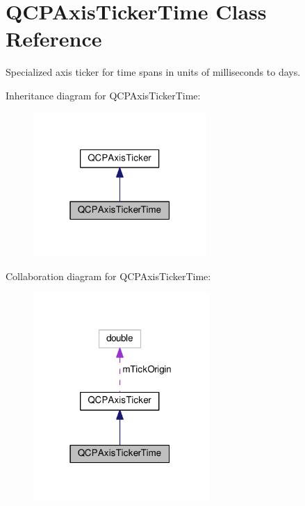 \hypertarget{classQCPAxisTickerTime}{}\section{Q\+C\+P\+Axis\+Ticker\+Time Class Reference}
\label{classQCPAxisTickerTime}


Specialized axis ticker for time spans in units of milliseconds to days.  




Inheritance diagram for Q\+C\+P\+Axis\+Ticker\+Time\+:
\nopagebreak
\begin{figure}[H]
\begin{center}
\leavevmode
\includegraphics[width=187pt]{classQCPAxisTickerTime__inherit__graph}
\end{center}
\end{figure}


Collaboration diagram for Q\+C\+P\+Axis\+Ticker\+Time\+:
\nopagebreak
\begin{figure}[H]
\begin{center}
\leavevmode
\includegraphics[width=190pt]{classQCPAxisTickerTime__coll__graph}
\end{center}
\end{figure}
